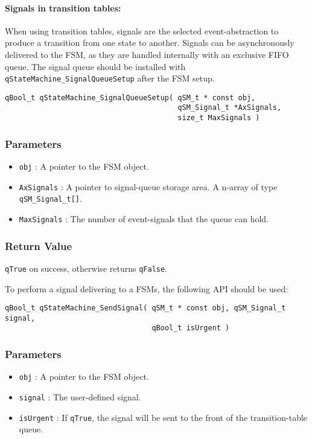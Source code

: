 \paragraph{Signals in transition tables:}
When using transition tables, signals are the selected event-abstraction to produce a transition from one state to another. Signals can be asynchronously delivered to the FSM, as they are handled internally with an exclusive FIFO queue. 
The signal queue should be installed with \lstinline{qStateMachine_SignalQueueSetup} after the FSM setup.
\medskip

\begin{lstlisting}[style=CStyle]
qBool_t qStateMachine_SignalQueueSetup( qSM_t * const obj, 
                                        qSM_Signal_t *AxSignals, 
                                        size_t MaxSignals )
\end{lstlisting} 

\subsubsection*{Parameters}
\begin{itemize}
    \item \lstinline{obj} : A pointer to the FSM object. 
    \item \lstinline{AxSignals} : A pointer to signal-queue storage area. A n-array of type \lstinline{qSM_Signal_t[]}.
    \item \lstinline{MaxSignals} : The number of event-signals that the queue can hold.
\end{itemize}

\subsubsection*{Return Value}
\lstinline{qTrue} on success, otherwise returns \lstinline{qFalse}.

\hrulefill
\medskip

To perform a signal delivering to a FSMs, the following API should be used:
\medskip

\begin{lstlisting}[style=CStyle]
qBool_t qStateMachine_SendSignal( qSM_t * const obj, qSM_Signal_t signal, 
                                  qBool_t isUrgent )
\end{lstlisting} 

\subsubsection*{Parameters}
\begin{itemize}
    \item \lstinline{obj} : A pointer to the FSM object. 
    \item \lstinline{signal} : The user-defined signal.
    \item \lstinline{isUrgent} : If \lstinline{qTrue}, the signal will be sent to the front of the transition-table queue.
\end{itemize}

